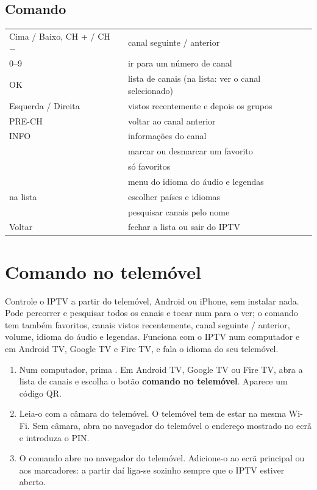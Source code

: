 \subsection{Comando}
\begin{xltabular}{\linewidth}{@{}KX@{}}
Cima / Baixo, CH + / CH $-$ & canal seguinte / anterior \\
0--9 & ir para um número de canal \\
OK & lista de canais (na lista: ver o canal selecionado) \\
Esquerda / Direita & vistos recentemente e depois os grupos \\
PRE-CH & voltar ao canal anterior \\
INFO & informações do canal \\
 & marcar ou desmarcar um favorito \\
 & só favoritos \\
 & menu do idioma do áudio e legendas \\
 na lista & escolher países e idiomas \\
 & pesquisar canais pelo nome \\
Voltar & fechar a lista ou sair do IPTV \\
\bottomrule
\end{xltabular}


\section{Comando no telemóvel}
\label{sec:remote}

Controle o IPTV a partir do telemóvel, Android ou iPhone, sem instalar nada.
Pode percorrer e pesquisar todos os canais e tocar num para o ver; o comando
tem também favoritos, canais vistos recentemente, canal seguinte / anterior,
volume, idioma do áudio e legendas. Funciona com o IPTV num computador e em
Android TV, Google TV e Fire TV, e fala o idioma do seu telemóvel.

\begin{enumerate}
  \item Num computador, prima . Em Android TV, Google TV ou Fire TV,
        abra a lista de canais e escolha o botão \textbf{comando no
        telemóvel}. Aparece um código QR.
  \item Leia-o com a câmara do telemóvel. O telemóvel tem de estar na mesma
        Wi-Fi. Sem câmara, abra no navegador do telemóvel o endereço
        mostrado no ecrã e introduza o PIN.
  \item O comando abre no navegador do telemóvel. Adicione-o ao ecrã
        principal ou aos marcadores: a partir daí liga-se sozinho sempre que
        o IPTV estiver aberto.
\end{enumerate}

